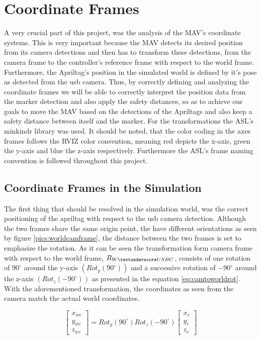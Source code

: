 \section{Coordinate Frames}
\label{sec:CoordianteFrames}

A very crucial part of this project, was the analysis of the MAV's coordinate systems. This is very important because the MAV detects its desired position from  its camera detections and then has to transform these detections, from the camera frame to the controller's reference frame with respect to the world frame. Furthermore, the Apriltag's position in the simulated world is defined by it's pose as detected from the usb camera. Thus, by correctly defining and analyzing the coordinate frames we will be able to correctly interpret the position data from the marker detection and also apply the safety distances, so as to achieve our goals to move the MAV based on the detections of the Apriltags and also keep a safety distance between itself and the marker. For the transformations the ASL's minkindr library was used. It should be noted, that the color coding in the axes frames follows the RVIZ color convention, meaning red depicts the x-axis, green the y-axis and blue the z-axis respectively. Furthermore the ASL's frame naming convention \cite{FrameNamingConvention} is followed throughout this project. 

\subsection{Coordinate Frames in the Simulation }
\label{sec: CoordinatesinSimulation}
 
The first thing that should be resolved in the simulation world, was the correct positioning of the apriltag with respect to the usb camera detection. Although the two frames share the same origin point, the have different orientations as seen by figure \ref{pics:worldcamframe}, the distance between the two frames is set to emphasize the rotation. As it can be seen the transformation form camera frame with respect to the world frame, $R_{W\textunderscore USBC}$, consists of one rotation of $90^{\circ}$ around the y-axis $(Rot_{y}(90^{\circ}))$ and a successive rotation of $-90^{\circ}$ around the z-axis $(Rot_z(-90^{\circ}))$ as presented in the equation \ref{eq:camtoworldrot}. With the aforementioned transformation, the coordinates as seen from the camera match the actual world coordinates. 
 
\begin{equation}
\label{eq:camtoworldrot}
\left[\begin{array}{c}
x_{wc} \\ y_{wc} \\ z_{wc}  \end{array} \right] = Rot_{y}(90^{\circ})Rot_z(-90^{\circ})\left[ \begin{array}{c} x_c \\ y_c \\z_c \end{array} \right]
\end{equation}
 
